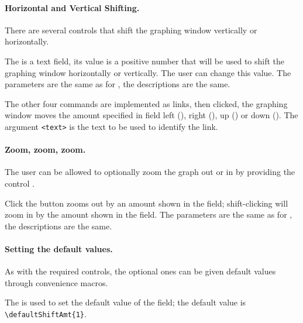 \documentclass{article}
\begin{document}
\paragraph{Horizontal and Vertical Shifting.} There are several
controls that shift the graphing window vertically or horizontally.

\begin{dCmd}{.75\linewidth}
\end{dCmd}
The  is a text field, its value is a positive number
that will be used to shift the graphing window horizontally or
vertically. The user can change this value. The parameters are the
same as for , the descriptions are the same.

The other four commands are implemented as links, then clicked, the
graphing window moves the amount specified in  field
left (), right (), up () or down
(). The argument \texttt{<text>} is the text to be used
to identify the link.

\paragraph{Zoom, zoom, zoom.}

The user can be allowed to optionally zoom the graph out or in by providing the
control .

\begin{dCmd}{.75\linewidth}
\end{dCmd}
Click the  button zooms out by an amount shown in the
 field; shift-clicking will zoom in by the amount shown
in the  field. The parameters are the same as for
, the descriptions are the same.

\paragraph{Setting the default values.} As with the required controls, the optional ones
can be given default values through convenience macros.


\begin{dCmd*}{.75\linewidth}
\end{dCmd*}
The  is used to set the default value of the  field; the default
value is \verb!\defaultShiftAmt{1}!.
\end{document}
